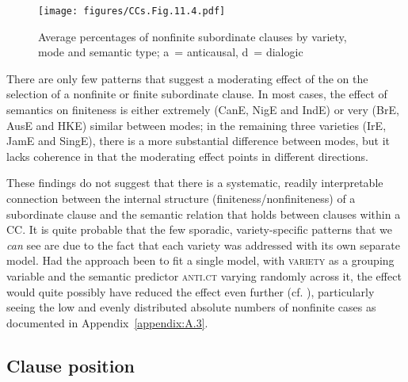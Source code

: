 \begin{figure}
\texttt{[image: figures/CCs.Fig.11.4.pdf]}
\caption{\label{bkm:Ref75863438}\label{fig:11.4}Average percentages of nonfinite subordinate clauses by variety, mode and semantic type; a~= anticausal, d~= dialogic}
\end{figure}

There are only few patterns that suggest a moderating effect of the  on the selection of a nonfinite or finite subordinate clause. In most cases, the effect of semantics on finiteness is either extremely (CanE, NigE and IndE) or very (BrE, AusE and HKE) similar between modes; in the remaining three varieties (IrE, JamE and SingE), there is a more substantial difference between modes, but it lacks coherence in that the moderating effect points in different directions.

These findings do not suggest that there is a systematic, readily interpretable connection between the internal structure (finiteness/nonfiniteness) of a subordinate clause and the semantic relation that holds between clauses within a CC. It is quite probable that the few sporadic, variety-specific patterns that we \textit{can} see are due to the fact that each variety was addressed with its own separate model. Had the approach been to fit a single model, with \textsc{variety} as a grouping variable and the semantic predictor \textsc{anti.ct} varying randomly across it, the  effect would quite possibly have reduced the effect even further (cf. ), particularly seeing the low and evenly distributed absolute numbers of nonfinite cases as documented in Appendix~\ref{appendix:A.3}.

\subsection{\label{bkm:Ref75784167}Clause position}\label{sec:11.2.3}\largerpage

